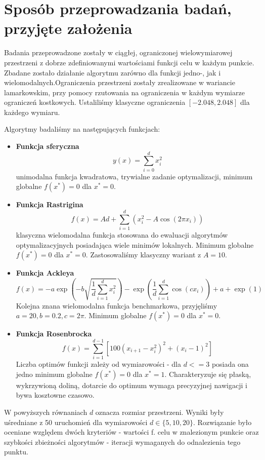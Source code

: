 \documentclass[12pt]{article}
\begin{document}
\section{Sposób przeprowadzania badań, przyjęte założenia}

Badania przeprowadzone zostały w ciągłej, ograniczonej wielowymiarowej przestrzeni z dobrze zdefiniowanymi wartościami funkcji celu w każdym punkcie.
Zbadane zostało działanie algorytmu zarówno dla funkcji jedno-, jak i wielomodalnych.Ograniczenia przestrzeni zostały zrealizowane w wariancie lamarkowskim,
przy pomocy rzutowania na ograniczenia w każdym wymiarze ograniczeń kostkowych. Ustaliliśmy klasyczne ograniczenia $[-2.048, 2.048]$ dla każdego wymiaru.


Algorytmy badaliśmy na następujących funkcjach:

\begin{itemize}
	\item \textbf{Funkcja sferyczna}  \[y(x) = \sum_{i = 0}^{d} x_i^2 \] unimodalna funkcja kwadratowa, trywialne
	      zadanie optymalizacji, minimum globalne $f(x^*) = 0$ dla $x^*=0$.

	\item \textbf{Funkcja Rastrigina} \[f(x) = A d + \sum_{i=1}^{d} \left( x_i^2 - A \cos(2\pi x_i) \right)\]
	      klasyczna wielomodalna
	      funkcja stosowana do ewaluacji algorytmów optymalizacyjnych posiadająca wiele minimów lokalnych.
	      Minimum globalne $f(x^*) = 0$ dla $x^*=0$.
	      Zastosowaliśmy klasyczny wariant z \(A = 10\).

	\item \textbf{Funkcja Ackleya} \[f(x) = -a \exp \left( -b \sqrt{\frac{1}{d} \sum_{i=1}^{d} x_i^2} \right)
		      - \exp \left( \frac{1}{d} \sum_{i=1}^{d} \cos(c x_i) \right) + a + \exp(1)\]
	      Kolejna znana wielomodalna funkcja benchmarkowa, przyjęliśmy \(a = 20, b = 0.2, c = 2\pi\). Minimum globalne
	      $f(x^*) = 0$ dla $x^*=0$.

	\item \textbf{Funkcja Rosenbrocka} \[f(x) = \sum_{i=1}^{d-1} \left[ 100 (x_{i+1} - x_i^2)^2 + (x_i - 1)^2 \right]\]
	      Liczba optimów funkcji zależy od wymiarowości - dla \(d <= 3\) posiada ona jedno minimum globalne $f(x^*) = 0$ dla $x^* = 1$.
	      Charakteryzuje się płaską, wykrzywioną doliną, dotarcie do optimum wymaga precyzyjnej nawigacji i bywa kosztowne czasowo.
\end{itemize}

W powyższych równaniach \(d\) oznacza rozmiar przestrzeni. Wyniki były uśredniane z 50 uruchomień dla wymiarowości \(d \in \{5, 10, 20\}\).
Rozwiązanie było oceniane względem dwóch kryteriów - wartości f. celu w znalezionym punkcie oraz szybkości
zbieżności algorytmów - iteracji wymaganych do odnalezienia tego punktu.
\end{document}
